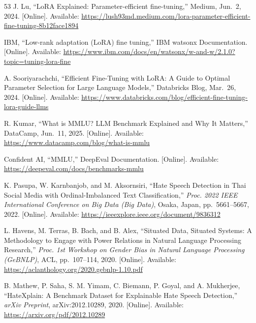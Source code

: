 \documentclass[12pt,oneside,openright,a4paper]{cpe-english-project}
\begin{document}
\begin{thebibliography}{53}
\hypertarget{bib:ref25}{} J. Lu, ``LoRA Explained: Parameter-efficient fine-tuning,''
Medium, Jun.~2, 2024. {[}Online{]}. Available:
\href{https://lush93md.medium.com/lora-parameter-efficient-fine-tuning-8b12face1894?utm_source=chatgpt.com}{https://lush93md.medium.com/lora-parameter-efficient-fine-tuning-8b12face1894}

\hypertarget{bib:ref26}{} IBM, ``Low-rank adaptation (LoRA) fine tuning,'' IBM watsonx
Documentation. {[}Online{]}. Available:
\href{https://www.ibm.com/docs/en/watsonx/w-and-w/2.1.0?topic=tuning-lora-fine&utm_source=chatgpt.com}{https://www.ibm.com/docs/en/watsonx/w-and-w/2.1.0?topic=tuning-lora-fine}

\hypertarget{bib:ref27}{} A. Sooriyarachchi, ``Efficient Fine-Tuning with LoRA: A Guide
to Optimal Parameter Selection for Large Language Models,'' Databricks
Blog, Mar.~26, 2024. {[}Online{]}. Available:
\url{https://www.databricks.com/blog/efficient-fine-tuning-lora-guide-llms}

\hypertarget{bib:ref28}{} R. Kumar, ``What is MMLU? LLM Benchmark Explained and Why It
Matters,'' DataCamp, Jun.~11, 2025. {[}Online{]}. Available:
\href{https://www.datacamp.com/blog/what-is-mmlu?utm_source=chatgpt.com}{https://www.datacamp.com/blog/what-is-mmlu}

\hypertarget{bib:ref29}{} Confident AI, ``MMLU,'' DeepEval Documentation. {[}Online{]}.
Available:
\href{https://deepeval.com/docs/benchmarks-mmlu?utm_source=chatgpt.com}{https://deepeval.com/docs/benchmarks-mmlu}

\hypertarget{bib:ref30}{} K. Pasupa, W. Karnbanjob, and M. Aksornsiri, ``Hate Speech
Detection in Thai Social Media with Ordinal-Imbalanced Text
Classification,'' \emph{Proc. 2022 IEEE International Conference on Big
Data (Big Data)}, Osaka, Japan, pp.~5661--5667, 2022. {[}Online{]}.
Available: \url{https://ieeexplore.ieee.org/document/9836312}

\hypertarget{bib:ref31}{} L. Havens, M. Terras, B. Bach, and B. Alex, ``Situated Data,
Situated Systems: A Methodology to Engage with Power Relations in
Natural Language Processing Research,'' \emph{Proc. 1st Workshop on
Gender Bias in Natural Language Processing (GeBNLP)}, ACL, pp.~107--114,
2020. {[}Online{]}. Available:
\url{https://aclanthology.org/2020.gebnlp-1.10.pdf}

\hypertarget{bib:ref32}{} B. Mathew, P. Saha, S. M. Yimam, C. Biemann, P. Goyal, and A.
Mukherjee, ``HateXplain: A Benchmark Dataset for Explainable Hate Speech
Detection,'' \emph{arXiv Preprint}, arXiv:2012.10289, 2020.
{[}Online{]}. Available: \url{https://arxiv.org/pdf/2012.10289}


\end{thebibliography}
\end{document}

